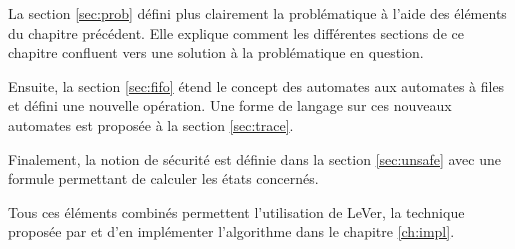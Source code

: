 La section \ref{sec:prob} défini plus clairement la problématique à l'aide des éléments du chapitre précédent. Elle explique comment les différentes sections de ce chapitre confluent vers une solution à la problématique en question.

Ensuite, la section \ref{sec:fifo} étend le concept des automates aux automates à files et défini une nouvelle opération. Une forme de langage sur ces nouveaux automates est proposée à la section \ref{sec:trace}.

Finalement, la notion de sécurité est définie dans la section \ref{sec:unsafe} avec une formule permettant de calculer les états concernés.

Tous ces éléments combinés permettent l'utilisation de LeVer, la technique proposée par \cite{Vardhan04} et d'en implémenter l'algorithme dans le chapitre \ref{ch:impl}.
